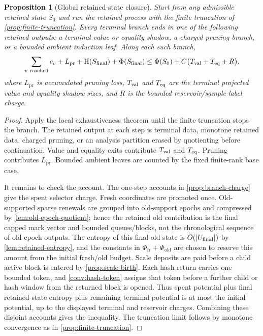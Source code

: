 \documentclass[11pt]{article}
\newcommand{\Cref}[1]{\ref{#1}}
\newtheorem{proposition}[theorem]{Proposition}
\theoremstyle{remark}
\newcommand{\HH}{\mathrm H}
\newcommand{\pr}{\mathrm{pr}}
\newcommand{\old}{\mathrm{old}}
\newcommand{\fr}{\mathrm{fr}}
\begin{document}
\begin{proposition}[Global retained-state closure]\label{prop:global-retained-closure}
Start from any admissible retained state $S_0$ and run the retained process with the finite truncation of \Cref{prop:finite-truncation}.  Every terminal branch ends in one of the following retained outputs: a terminal value or equality shadow, a charged pruning branch, or a bounded ambient induction leaf.  Along each such branch,
\[
        \sum_{v\ {\rm reached}} c_v+L_{\pr}+\HH(S_{\rm final})+\Phi(S_{\rm final})
        \le \Phi(S_0)+C\bigl(T_{\rm val}+T_{\rm eq}+R\bigr),
\]
where $L_{\pr}$ is accumulated pruning loss, $T_{\rm val}$ and $T_{\rm eq}$ are the terminal projected value and equality-shadow sizes, and $R$ is the bounded reservoir/sample-label charge.
\end{proposition}

\begin{proof}
Apply the local exhaustiveness theorem until the finite truncation stops the branch.  The retained output at each step is terminal data, monotone retained data, charged pruning, or an analysis partition erased by quotienting before continuation.  Value and equality exits contribute $T_{\rm val}$ and $T_{\rm eq}$.  Pruning contributes $L_{\pr}$.  Bounded ambient leaves are counted by the fixed finite-rank base case.

It remains to check the account.  The one-step accounts in \Cref{prop:branch-charge} give the spent selector charge.  Fresh coordinates are promoted once.  Old-supported sparse renewals are grouped into old-support epochs and compressed by \Cref{lem:old-epoch-quotient}; hence the retained old contribution is the final capped mark vector and bounded queues/blocks, not the chronological sequence of old epoch outputs.  The entropy of this final old state is $O(|U_{\rm final}|)$ by \Cref{lem:retained-entropy}, and the constants in $\Phi_{\fr}+\Phi_{\old}$ are chosen to reserve this amount from the initial fresh/old budget.  Scale deposits are paid before a child active block is entered by \Cref{prop:scale-birth}.  Each hash return carries one bounded token, and \Cref{conv:hash-token} assigns that token before a further child or hash window from the returned block is opened.  Thus spent potential plus final retained-state entropy plus remaining terminal potential is at most the initial potential, up to the displayed terminal and reservoir charges.  Combining these disjoint accounts gives the inequality.  The truncation limit follows by monotone convergence as in \Cref{prop:finite-truncation}.
\end{proof}
\end{document}
